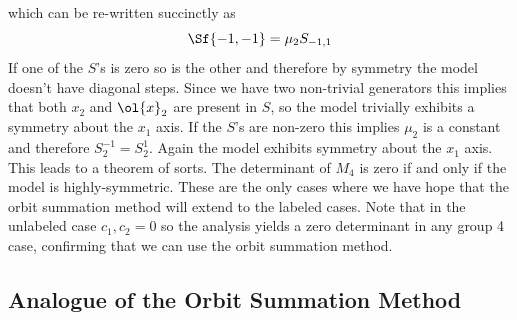 which can be re-written succinctly as
\[
	\Sf{-1,-1} = \mu_2 S_{-1,1}
\]
If one of the $S$'s is zero so is the other and therefore by symmetry the model doesn't have diagonal steps. Since we have two non-trivial generators this implies that both $x_2$ and $\ol{x}_2$ are present in $S$, so the model trivially exhibits a symmetry about the $x_1$ axis. If the $S$'s are non-zero this implies $\mu_2$ is a constant and therefore $S_2^{-1} = S_2^1$. Again the model exhibits symmetry about the $x_1$ axis. This leads to a theorem of sorts. The determinant of $M_4$ is zero if and only if the model is highly-symmetric. These are the only cases where we have hope that the orbit summation method will extend to the labeled cases. Note that in the unlabeled case $c_1,c_2 = 0$ so the analysis yields a zero determinant in any group 4 case, confirming that we can use the orbit summation method.

\subsection{Analogue of the Orbit Summation Method}

